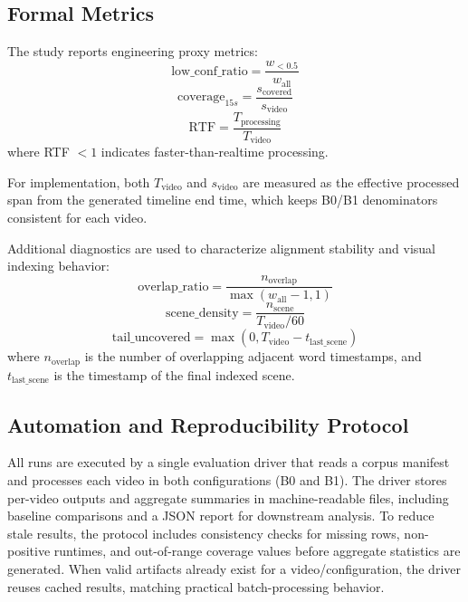\documentclass[conference]{IEEEtran}
\begin{document}
\subsection{Formal Metrics}
The study reports engineering proxy metrics:
\begin{equation}
\text{low\_conf\_ratio} = \frac{w_{<0.5}}{w_{\text{all}}}
\end{equation}
\begin{equation}
\text{coverage}_{15s} = \frac{s_{\text{covered}}}{s_{\text{video}}}
\end{equation}
\begin{equation}
\text{RTF} = \frac{T_{\text{processing}}}{T_{\text{video}}}
\end{equation}
where RTF $< 1$ indicates faster-than-realtime processing.

For implementation, both $T_{\text{video}}$ and $s_{\text{video}}$ are measured as the effective processed span from the generated timeline end time, which keeps B0/B1 denominators consistent for each video.

Additional diagnostics are used to characterize alignment stability and visual indexing behavior:
\begin{equation}
\text{overlap\_ratio} = \frac{n_{\text{overlap}}}{\max(w_{\text{all}}-1,1)}
\end{equation}
\begin{equation}
\text{scene\_density} = \frac{n_{\text{scene}}}{T_{\text{video}}/60}
\end{equation}
\begin{equation}
\text{tail\_uncovered} = \max(0, T_{\text{video}} - t_{\text{last\_scene}})
\end{equation}
where $n_{\text{overlap}}$ is the number of overlapping adjacent word timestamps, and $t_{\text{last\_scene}}$ is the timestamp of the final indexed scene.

\subsection{Automation and Reproducibility Protocol}
All runs are executed by a single evaluation driver that reads a corpus manifest and processes each video in both configurations (B0 and B1). The driver stores per-video outputs and aggregate summaries in machine-readable files, including baseline comparisons and a JSON report for downstream analysis. To reduce stale results, the protocol includes consistency checks for missing rows, non-positive runtimes, and out-of-range coverage values before aggregate statistics are generated. When valid artifacts already exist for a video/configuration, the driver reuses cached results, matching practical batch-processing behavior.
\end{document}
